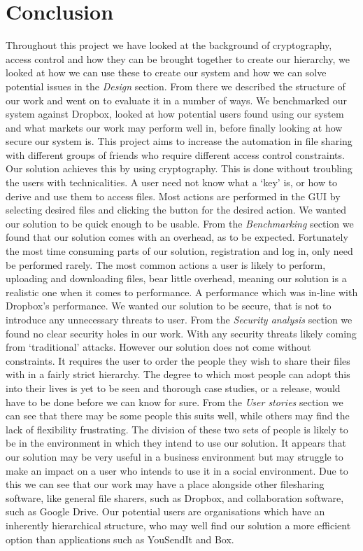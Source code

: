 \documentclass[12pt, titlepage]{article}
\begin{document}
\section{Conclusion}
Throughout this project we have looked at the background of cryptography, access control and how they can be brought together to create our hierarchy, we looked at how we can use these to create our system and how we can solve potential issues in the \textit{Design} section. From there we described the structure of our work and went on to evaluate it in a number of ways. We benchmarked our system against Dropbox, looked at how potential users found using our system and what markets our work may perform well in, before finally looking at how secure our system is.
\newline \indent This project aims to increase the automation in file sharing with different groups of friends who require different access control constraints. Our solution achieves this by using cryptography. This is done without troubling the users with technicalities. A user need not know what a `key' is, or how to derive and use them to access files. Most actions are performed in the GUI by selecting desired files and clicking the button for the desired action.
\newline \indent We wanted our solution to be quick enough to be usable. From the \textit{Benchmarking} section we found that our solution comes with an overhead, as to be expected. Fortunately the most time consuming parts of our solution, registration and log in, only need be performed rarely. The most common actions a user is likely to perform, uploading and downloading files, bear little overhead, meaning our solution is a realistic one when it comes to performance. A performance which was in-line with Dropbox's performance.
\newline \indent We wanted our solution to be secure, that is not to introduce any unnecessary threats to user. From the \textit{Security analysis} section we found no clear security holes in our work. With any security threats likely coming from `traditional' attacks.
\newline \indent However our solution does not come without constraints. It requires the user to order the people they wish to share their files with in a fairly strict hierarchy. The degree to which most people can adopt this into their lives is yet to be seen and thorough case studies, or a release, would have to be done before we can know for sure. From the \textit{User stories} section we can see that there may be some people this suits well, while others may find the lack of flexibility frustrating. The division of these two sets of people is likely to be in the environment in which they intend to use our solution. It appears that our solution may be very useful in a business environment but may struggle to make an impact on a user who intends to use it in a social environment. Due to this we can see that our work may have a place alongside other filesharing software, like general file sharers, such as Dropbox, and collaboration software, such as Google Drive. Our potential users are organisations which have an inherently hierarchical structure, who may well find our solution a more efficient option than applications such as YouSendIt and Box.
\end{document}
